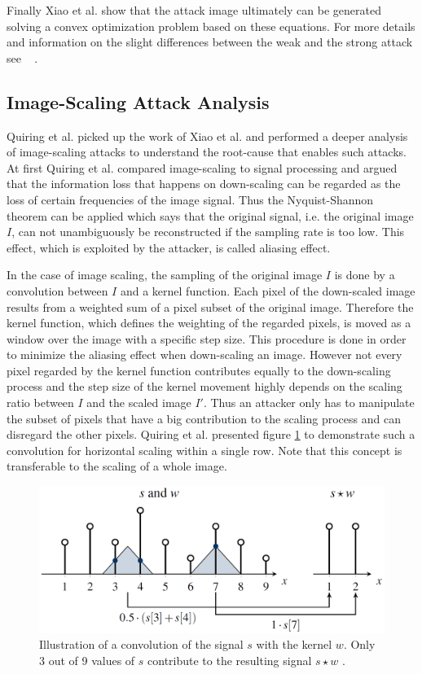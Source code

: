 \documentclass[sigconf]{acmart}
\begin{document}
Finally Xiao et al. show that the attack image ultimately can be generated solving a convex optimization problem based on these equations.
For more details and information on the slight differences between the weak and the strong attack see ~ \cite{camouflage}.

\subsection{Image-Scaling Attack Analysis}
\label{sec:imgscalemethod}
Quiring et al.\cite{imgscale} picked up the work of Xiao et al. and performed a deeper analysis of image-scaling attacks to understand the root-cause that enables such attacks.
At first Quiring et al. compared image-scaling to signal processing and argued that the information loss that happens on down-scaling can be regarded as the loss of certain frequencies of the image signal.
Thus the Nyquist-Shannon theorem \cite{10.5555/1795494} can be applied which says that the original signal, i.e. the original image $I$, can not unambiguously be reconstructed if the sampling rate is too low.
This effect, which is exploited by the attacker, is called aliasing effect.

In the case of image scaling, the sampling of the original image $I$ is done by a convolution between $I$ and a kernel function.
Each pixel of the down-scaled image results from a weighted sum of a pixel subset of the original image.
Therefore the kernel function, which defines the weighting of the regarded pixels, is moved as a window over the image with a specific step size.
This procedure is done in order to minimize the aliasing effect when down-scaling an image.
However not every pixel regarded by the kernel function contributes equally to the down-scaling process and the step size of the kernel movement highly depends on the scaling ratio between $I$ and the scaled image $I'$.
Thus an attacker only has to manipulate the subset of pixels that have a big contribution to the scaling process and can disregard the other pixels.
Quiring et al. presented figure \ref{sec:conscale} to demonstrate such a convolution for horizontal scaling within a single row.
Note that this concept is transferable to the scaling of a whole image.

\begin{figure}[h]
  \centering
  \includegraphics[width=\linewidth]{img/conscale.png}
  \caption{Illustration of a convolution of the signal $s$ with the kernel $w$. Only 3 out of 9 values of $s$ contribute to the resulting signal $s \star w$ \cite{imgscale}.}
  \Description{}
  \label{sec:conscale}
\end{figure}
\end{document}
